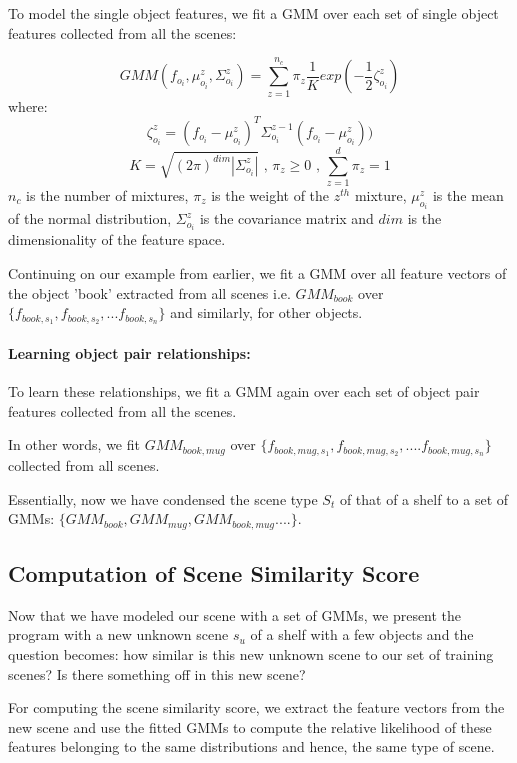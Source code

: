 \documentclass[12pt]{article}
\begin{document}
To model the single object features, we fit a GMM over each set of single object features collected from all the scenes:

\[
GMM(f_{o_i}, \mu_{o_i}^z, \Sigma_{o_i}^z) = \sum_{z=1}^{n_c} \pi_z \frac{1}{K}
exp(-\frac{1}{2} \zeta_{o_i}^z)
\]
where: 
\[\zeta_{o_i}^z = (f_{o_i} - \mu_{o_i}^z)^T \Sigma_{o_i}^{z - 1} (f_{o_i} - \mu_{o_i}^z)) \]
\[K = \sqrt{(2\pi)^{dim}|\Sigma_{o_i}^z|} \text{   ,   } 
\pi_z \geq 0 \text{   ,   }
\sum_{z = 1}^{d}\pi_z = 1\]
$n_c$ is the number of mixtures, $\pi_z$ is the weight of the $z^{th}$ mixture, $\mu_{o_i}^z$ is the mean of the normal distribution, $\Sigma_{o_i}^z$ is the covariance matrix and $dim$ is the dimensionality of the feature space.

Continuing on our example from earlier, we fit a GMM over all feature vectors of the object 'book' extracted from all scenes i.e. $GMM_{book}$ over $\{f_{book, s_{1}}, f_{book, s_{2}},...f_{book, s_{n}}\}$ and similarly, for other objects.

\paragraph{Learning object pair relationships:}

To learn these relationships, we fit a GMM again over each set of object pair features collected from all the scenes.

In other words, we fit $GMM_{book,mug}$ over $\{f_{book, mug, s_{1}}, f_{book, mug, s_{2}},....f_{book, mug, s_{n}}\}$ collected from all scenes.

Essentially, now we have condensed the scene type $S_t$ of that of a shelf to a set of GMMs: $\{GMM_{book}, GMM_{mug}, GMM_{book, mug}....\}$.


\subsection{Computation of Scene Similarity Score}

Now that we have modeled our scene with a set of GMMs, we present the program with a new unknown scene $s_u$ of a shelf with a few objects and the question becomes: how similar is this new unknown scene to our set of training scenes? Is there something off in this new scene?

For computing the scene similarity score, we extract the feature vectors from the new scene and use the fitted GMMs to compute the relative likelihood of these features belonging to the same distributions and hence, the same type of scene. 
\end{document}
